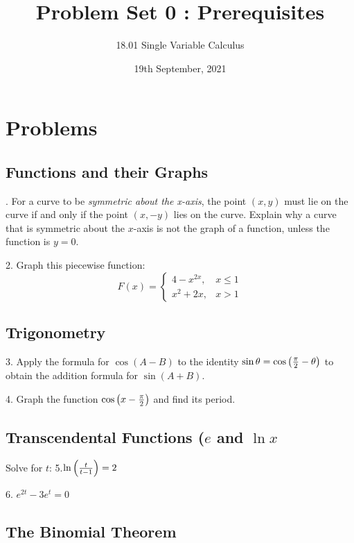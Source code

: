 \documentclass{article}
\title{\textbf{Problem Set 0 : Prerequisites}}
\author{18.01 Single Variable Calculus}
\date{19th September, 2021}
\begin{document}
\maketitle

\section{Problems}
\subsection{Functions and their Graphs}

. For a curve to be \textit{symmetric about the x-axis}, the point $(x,y)$ must lie on the curve if and only if the point $(x,-y)$ lies on the curve. Explain why a curve that is symmetric about the $x$-axis is not the graph of a function, unless the function is $y=0$.

\noindent
\vspace{2.5mm}

2. Graph this piecewise function:
\[ F(x) = \begin{cases}
	   4-x^{2x}, &  x \leq 1 \\
	   x^{2}+2x, &  x > 1 
	  \end{cases}
\]

\subsection{Trigonometry}
3. Apply the formula for $\cos(A-B)$ to the identity $\sin \theta = \cos \qty(\frac{\pi}{2} - \theta )$ to obtain the addition formula for $\sin (A+B)$.

\noindent
\vspace{2.5mm}

4. Graph the function $\cos \qty(x - \frac{\pi}{2})$ and find its period. 

\subsection{Transcendental Functions ($e$ and $\ln{x}$}

\noindent
\vspace{2.5mm}
Solve for $t$:
5.$ \ln{\qty(\frac{t}{t-1})} = 2$

\noindent
\vspace{2.5mm}

6. $e^{2t}-3e^{t}=0$

\subsection{The Binomial Theorem}
\end{document}
